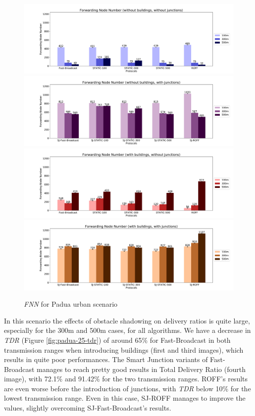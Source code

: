 		\begin{figure}[H]
			\centering
			\includegraphics[width=1.0\textwidth]{immagini/padua-25/b0/j0/fnn}
			\includegraphics[width=1.0\textwidth]{immagini/padua-25/b0/j1/fnn}
			\includegraphics[width=1.0\textwidth]{immagini/padua-25/b1/j0/fnn}
			\includegraphics[width=1.0\textwidth]{immagini/padua-25/b1/j1/fnn}
			\caption{\textit{FNN} for Padua urban scenario}
			\label{fig:padua-25-fnn}
		\end{figure}
	
		In this scenario the effects of obstacle shadowing on delivery ratios is quite large, especially for the 300m and 500m cases, for all algorithms. We have a decrease in \textit{TDR} (Figure \ref{fig:padua-25-tdr}) of around 65\% for Fast-Broadcast in both transmission ranges when introducing buildings (first and third images), which results in quite poor performances. The Smart Junction variants of Fast-Broadcast manages to reach pretty good results in Total Delivery Ratio (fourth image), with 72.1\% and 91.42\% for the two transmission ranges. ROFF's results are even worse before the introduction of junctions, with \textit{TDR} below 10\% for the lowest transmission range. Even in this case, SJ-ROFF manages to improve the values, slightly overcoming SJ-Fast-Broadcast's results.
		
